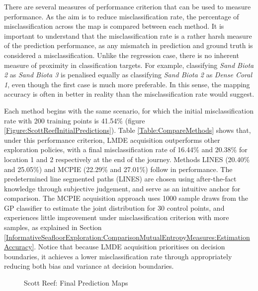 			There are several measures of performance criterion that can be used to measure performance. As the aim is to reduce misclassification rate, the percentage of misclassification across the map is compared between each method. It is important to understand that the misclassification rate is a rather harsh measure of the prediction performance, as any mismatch in prediction and ground truth is considered a misclassification. Unlike the regression case, there is no inherent measure of proximity in classification targets. For example, classifying \textit{Sand Biota 2} as \textit{Sand Biota 3} is penalised equally as classifying \textit{Sand Biota 2} as \textit{Dense Coral 1}, even though the first case is much more preferable. In this sense, the mapping accuracy is often in better in reality than the misclassification rate would suggest.
			
			Each method begins with the same scenario, for which the initial misclassification rate with 200 training points is 41.54\% (figure \ref{Figure:ScottReefInitialPredictions}). Table \ref{Table:CompareMethods} shows that, under this performance criterion, LMDE acquisition outperforms other exploration policies, with a final misclassification rate of 16.44\% and 20.38\% for location 1 and 2 respectively at the end of the journey. Methods LINES (20.40\% and 25.05\%) and MCPIE (22.29\% and 27.01\%) follow in performance. The predetermined line segmented paths (LINES) are chosen using after-the-fact knowledge through subjective judgement, and serve as an intuitive anchor for comparison. The MCPIE acquisition approach uses 1000 sample draws from the GP classifier to estimate the joint distribution for 30 control points, and experiences little improvement under misclassification criterion with more samples, as explained in Section \ref{InformativeSeafloorExploration:ComparisonMutualEntropyMeasures:EstimationAccuracy}. Notice that because LMDE acquisition prioritises on decision boundaries, it achieves a lower misclassification rate through appropriately reducing both bias and variance at decision boundaries.
			
			\begin{figure}[!htbp]
			\centering
			\caption{Scott Reef: Final Prediction Maps}
			\label{Figure:FinalPredictionMap}
			\end{figure}
		
